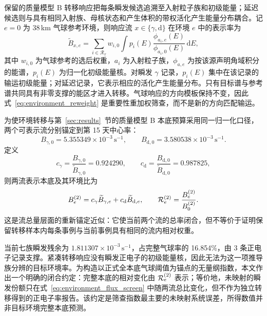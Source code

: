 \documentclass[11pt]{article}
\newcommand{\cps}{\,\mathrm{s^{-1}}}
\begin{document}
保留的质量模型 B 转移响应把每条瞬发候选追溯至入射粒子族和初级能量；延迟候选则与具有相同入射族、母核状态和产生体积的带权活化产生能量分布耦合。记 $e=0$ 为 38\,km 气球参考环境，则响应流 $x\in\{\gamma,\mathrm d\}$ 在环境 $e$ 中的表示率为
\begin{equation}
 \widetilde B_{x,e}=
 \sum_{i\in\mathcal R_x}w_{i,0}
 \int p_i(E)
 \frac{\phi_{a_i,e}(E)}{\phi_{a_i,0}(E)}
 \,\mathrm dE ,
 \label{eq:environment_reweight}
\end{equation}
其中 $w_{i,0}$ 为气球参考的选后权重，$a_i$ 为入射粒子族，$\phi_{a,e}$ 为按该源声明角域积分的能谱，$p_i(E)$ 为归一化初级能量核。对瞬发 $\gamma$ 记录，$p_i(E)$ 集中在该记录的输运初级能量；对延迟记录，它表示相应的活化产生能量分布。只有目标谱与参考谱共同具有非零支撑的能区才进入转移。气球响应的方向模板保持不变，因此式~\eqref{eq:environment_reweight} 是重要性重加权筛查，而不是新的方向匹配输运。

为使环境转移与第~\ref{sec:results}~节的质量模型 B 本底预算采用同一归一化口径，两个可表示流分别锚定到第 15 天中心率：
\[
 B_{\gamma,0}=5.355349\times10^{-3}\cps,\qquad
 B_{\mathrm d,0}=3.580538\times10^{-3}\cps .
\]
定义
\[
 c_\gamma=\frac{B_{\gamma,0}}{\widetilde B_{\gamma,0}}=0.924290,
 \qquad
 c_{\mathrm d}=\frac{B_{\mathrm d,0}}{\widetilde B_{\mathrm d,0}}=0.987825,
\]
则两流表示本底及其环境比为
\begin{equation}
 B^{(2)}_e=c_\gamma\widetilde B_{\gamma,e}
          +c_{\mathrm d}\widetilde B_{\mathrm d,e},
 \qquad
 {\cal R}^{(2)}_e=\frac{B^{(2)}_e}{B^{(2)}_0}.
 \label{eq:environment_two_stream}
\end{equation}
这是流总量层面的重新锚定近似：它使当前两个流的总率闭合，但不等价于证明保留转移样本内每条事例与当前事例具有相同的流内相对权重。

当前七族瞬发残余为 $1.811307\times10^{-3}\cps$，占完整气球率的 16.854\%，由 3 条正电子记录支撑。紧凑转移响应没有瞬发正电子的初级能量核，因此无法为这一项推导族分辨的目标环境率。为构造以正式全本底气球阈值为锚点的无量纲指数，本文作出一个明确的闭合约定：完整本底的相对变化由 $ {\cal R}^{(2)}_e$ 表示；等价地，未映射的瞬发份额只在式~\eqref{eq:environment_flux_screen} 中随两流总比变化，但不作为独立转移得到的正电子率报告。该约定是筛查指数最主要的未映射系统误差，所得数值并非目标环境完整本底预测。
\end{document}
